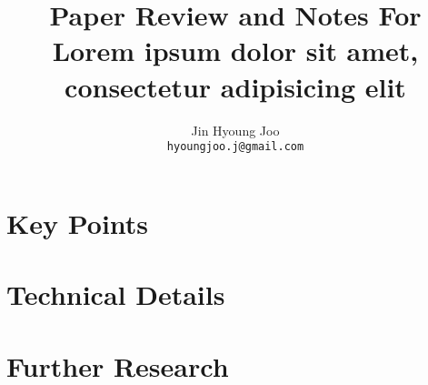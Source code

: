 \documentclass[10pt,twocolumn,letterpaper]{article}
\begin{document}
\title{Paper Review and Notes For\\Lorem ipsum dolor sit amet, consectetur adipisicing elit}

\author{Jin Hyoung Joo\\ {\tt\small hyoungjoo.j@gmail.com} }
\maketitle

\begin{abstract}
\end{abstract}

\section{Key Points}
\section{Technical Details}
\section{Further Research}

{\small   }
\end{document}
